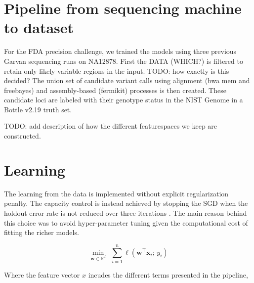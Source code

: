 \documentclass{article}
\newcommand{\w}{\mathbf{w}}
\newcommand{\x}{\mathbf{x}}
\newcommand{\R}{\mathbb{R}}
\newcommand{\tr}{{\!\top}}
\begin{document}







\section{Pipeline from sequencing machine to dataset}



For the FDA precision challenge, we trained the models using three previous Garvan sequencing runs on NA12878.
First the DATA (WHICH?) is filtered to retain only likely-variable regions in the input. TODO: how exactly is this decided?
The union set of candidate variant calls using alignment (bwa mem and freebayes) and assembly-based (fermikit) processes is then created.
These candidate loci are labeled with their genotype status in the NIST Genome in a Bottle v2.19 truth set. 

TODO: add description of how the different featurespaces we keep are constructed.

\section{Learning}

The learning from the data is implemented without explicit regularization penalty. The capacity control is instead achieved by stopping the SGD when the holdout error rate is not reduced over three iterations \citep{hardt2015train}.
The main reason behind this choice was to avoid hyper-parameter tuning given the computational cost of fitting the richer models.


\begin{equation}
  \min_{\w \in \R^d}~~\sum_{i=1}^n\ell(\w^\tr\x_i;\,y_i) 
  \label{eqn:objective}
\end{equation}

Where the feature vector $x$ incudes the different terms presented in the pipeline, 
\end{document}
